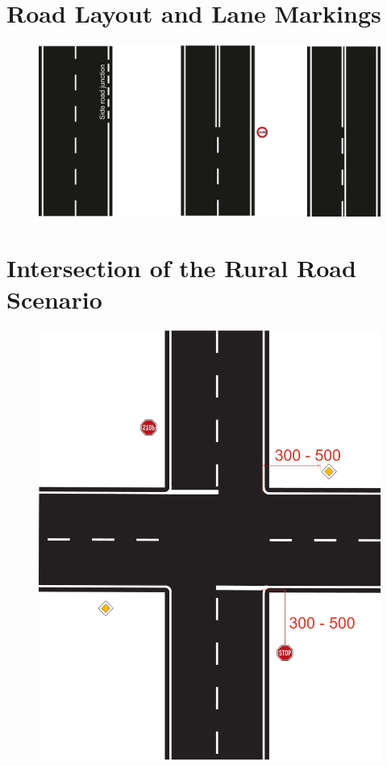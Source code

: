\section{Road Layout and Lane Markings}
\label{fig_road_layout}
\begin{figure}[H]
	\begin{center}
		\centering\includegraphics[]{graphics/Abb_4_road_layout.jpg}
	\end{center}
\end{figure}

\section{Intersection of the Rural Road Scenario}
\label{fig_intersection_rural}
\begin{figure}[H]
	\begin{center}
		\centering\includegraphics[]{graphics/Abb_5_intersection.jpg}
	\end{center}
\end{figure}

